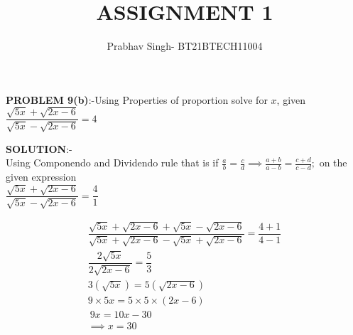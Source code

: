 \documentclass[journal,12pt,twocolumn]{IEEEtran}
\begin{document}
	\vspace{3cm}
	\title{ASSIGNMENT 1}
	\author{Prabhav Singh- BT21BTECH11004}
	
	\maketitle
	\textbf{PROBLEM 9(b)}:-Using Properties of proportion solve for $ x $, given\\
	
	
	\hspace*{2cm}$ 	\dfrac{\sqrt{5x}+\sqrt{2x-6}}{\sqrt{5x}-\sqrt{2x-6}} =4 $
	
	
	\medskip
	
	
	\textbf{SOLUTION}:-\\
	Using Componendo and Dividendo rule that is if $  \frac{a}{b} =\frac{c}{d} \implies \frac{a+b}{a-b} =\frac{c+d}{c-d}; $ on the given expression\\
	
	 $	\dfrac{\sqrt{5x}+\sqrt{2x-6}}{\sqrt{5x}-\sqrt{2x-6}} =\dfrac{4}{1} $
	
	\begin{align}
		\dfrac{\sqrt{5x}+\sqrt{2x-6}+\sqrt{5x}-\sqrt{2x-6}}{\sqrt{5x}+\sqrt{2x-6}-\sqrt{5x}+\sqrt{2x-6}} =\dfrac{4+1}{4-1} \\ 
		\dfrac{2\sqrt{5x}}{2\sqrt{2x-6}} =\dfrac{5}{3} \\
		3(\sqrt{5x})=5(\sqrt{2x-6}) \\
		9\times5x=5\times5\times(2x-6) \\
		\ 9x=10x-30 \\
		\implies \boxed{ x=30} 
	\end{align}
	
	
	
\end{document}
